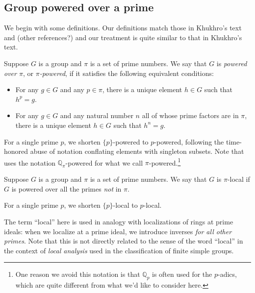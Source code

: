 \documentclass{ucetd}
\begin{document}
\subsection{Group powered over a prime}\label{sec:group-powering-def}

We begin with some definitions. Our definitions match those in
Khukhro's text \cite{Khukhro} and (other references?) and our
treatment is quite similar to that in Khukhro's text.

\begin{definer}\label{def:poweredgroup}
  Suppose $G$ is a group and $\pi$ is a set of prime numbers. We say
  that $G$ is {\em powered over $\pi$}, or {\em $\pi$-powered}, if it satisfies
  the following equivalent conditions:

  \begin{itemize}
  \item For any $g \in G$ and any $p \in
    \pi$, there is a unique element $h \in G$ such that $h^p = g$.
  \item For any $g \in G$ and any natural number $n$ all of whose
    prime factors are in $\pi$, there is a unique element $h \in G$
    such that $h^n = g$.
  \end{itemize}
\end{definer}

For a single prime $p$, we shorten $\{ p \}$-powered to $p$-powered,
following the time-honored abuse of notation conflating elements with
singleton subsets. Note that \cite{Khukhro} uses the notation
$\mathbb{Q}_\pi$-powered for what we call $\pi$-powered.\footnote{One
  reason we avoid this notation is that $\mathbb{Q}_p$ is often used
  for the $p$-adics, which are quite different from what we'd like to
  consider here.}

\begin{definer}\label{def:localgroup}
  Suppose $G$ is a group and $\pi$ is a set of prime numbers. We say
  that $G$ is $\pi$-local if $G$ is powered over all the primes {\em
    not} in $\pi$.
\end{definer}

For a single prime $p$, we shorten $\{ p \}$-local to $p$-local.

The term ``local'' here is used in analogy with localizations of rings
at prime ideals: when we localize at a prime ideal, we introduce
inverses {\em for all other primes}. Note that this is not directly
related to the sense of the word ``local'' in the context of {\em
  local analysis} used in the classification of finite simple groups.
\end{document}
